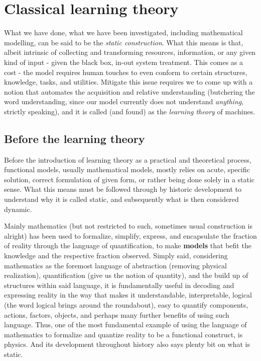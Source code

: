 \chapter{Classical learning theory}
What we have done, what we have been investigated, including mathematical modelling, can be said to be the \textit{static construction}. What this means is that, albeit intrinsic of collecting and transforming resources, information, or any given kind of input - given the black box, in-out system treatment. This comes as a cost - the model requires human touches to even conform to certain structures, knowledge, tasks, and utilities. Mitigate this issue requires we to come up with a notion that automates the acquisition and relative understanding (butchering the word understanding, since our model currently does not understand \textit{anything}, strictly speaking), and it is called (and found) as the \textit{learning theory} of machines. 

\section{Before the learning theory}

Before the introduction of learning theory as a practical and theoretical process, functional models, usually mathematical models, mostly relies on acute, specific solution, correct formulation of given form, or rather being done solely in a static sense. What this means must be followed through by historic development to understand why it is called static, and subsequently what is then considered dynamic. 

Mainly mathematics (but not restricted to such, sometimes usual construction is alright) has been used to formalize, simplify, express, and encapsulate the fraction of reality through the language of quantification, to make \textbf{models} that befit the knowledge and the respective fraction observed. Simply said, considering mathematics as the foremost language of abstraction (removing physical realization), quantification (give us the notion of quantity), and the build up of structures within said language, it is fundamentally useful in decoding and expressing reality in the way that makes it understandable, interpretable, logical (the word logical brings around the roundabout), easy to quantify components, actions, factors, objects, and perhaps many further benefits of using such language. Thus, one of the most fundamental example of using the language of mathematics to formalize and quantize reality to be a functional construct, is physics. And its development throughout history also says plenty bit on what is static. 


